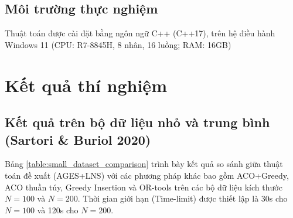 \documentclass[../DoAn.tex]{subfiles}
\begin{document}
	\subsection{Môi trường thực nghiệm}
    Thuật toán được cài đặt bằng ngôn ngữ C++ (C++17), trên hệ điều hành Windows 11 (CPU: R7-8845H, 8 nhân, 16 luồng; RAM: 16GB)

	\section{Kết quả thí nghiệm}

	\subsection{Kết quả trên bộ dữ liệu nhỏ và trung bình (Sartori \& Buriol 2020)}
	
	Bảng \ref{table:small_dataset_comparison} trình bày kết quả so sánh giữa thuật toán đề xuất (AGES+LNS) với các phương pháp khác bao gồm ACO+Greedy, ACO thuần túy, Greedy Insertion và OR-tools trên các bộ dữ liệu kích thước $N=100$ và $N=200$. Thời gian giới hạn (Time-limit) được thiết lập là 30s cho $N=100$ và 120s cho $N=200$.
\end{document}
